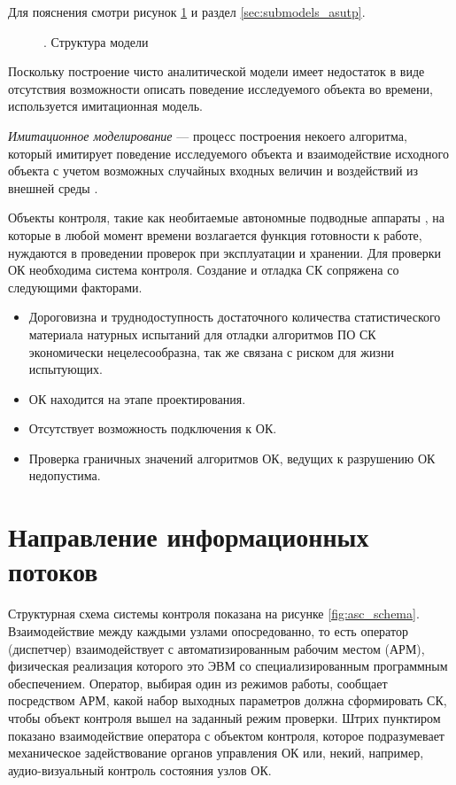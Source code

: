 Для пояснения смотри рисунок \ref{fig:submodels_asu_tp} и раздел \ref{sec:submodels_asutp}.

\begin{center}
    \begin{figure}[hb]
        \caption{. Структура модели}\label{fig:submodels_asu_tp}
    \end{figure}
\end{center}

Поскольку построение чисто аналитической модели имеет недостаток  в виде отсутствия возможности
описать поведение исследуемого объекта во времени, используется имитационная модель.

\textit{Имитационное моделирование} --- процесс построения некоего алгоритма, который имитирует
поведение исследуемого объекта и взаимодействие исходного объекта с учетом возможных случайных входных величин и
воздействий из внешней среды \cite{book:vvedeni_imit_model_1987}.

Объекты контроля, такие как
    необитаемые автономные подводные аппараты \todo{\ldots},
на которые в любой момент времени возлагается функция готовности к  работе,
нуждаются в проведении проверок при эксплуатации и хранении.
Для проверки ОК необходима система контроля. Создание и отладка СК сопряжена со следующими факторами.
\begin{itemize}
    \item Дороговизна и труднодоступность достаточного количества статистического материала
    натурных испытаний для отладки алгоритмов ПО СК экономически нецелесообразна, так же связана с риском для жизни испытующих.
    \item ОК находится на этапе проектирования.
    \item Отсутствует возможность подключения к ОК.
    \item Проверка граничных значений алгоритмов ОК, ведущих к разрушению ОК недопустима.
\end{itemize}



\section{Направление информационных потоков} %

Структурная схема системы контроля показана на рисунке \ref{fig:asc_schema}.
Взаимодействие между каждыми узлами опосредованно, то есть
оператор (диспетчер) взаимодействует с автоматизированным рабочим местом (АРМ),
физическая реализация которого это ЭВМ со специализированным программным обеспечением.
Оператор, выбирая один из режимов работы, сообщает посредством АРМ,
какой набор выходных параметров должна сформировать СК, чтобы объект контроля вышел на заданный режим проверки.
Штрих пунктиром показано взаимодействие оператора с объектом контроля,
которое подразумевает механическое задействование органов управления ОК
или, некий, например, аудио-визуальный контроль состояния узлов ОК.

